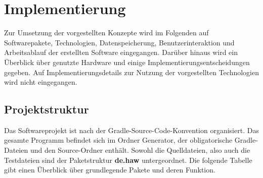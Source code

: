 
\chapter{Implementierung}

Zur Umsetzung der vorgestellten Konzepte wird im Folgenden auf Softwarepakete, Technologien, Datenspeicherung,
Benutzerinteraktion und Arbeitsablauf der erstellten Software eingegangen.
Darüber hinaus wird ein Überblick über genutzte Hardware und einige Implementierungsentscheidungen gegeben.
Auf Implementierungsdetails zur Nutzung der vorgestellten Technologien wird nicht eingegangen.

\section{Projektstruktur}
Das Softwareprojekt ist nach der Gradle-Source-Code-Konvention organisiert.
Das gesamte Programm befindet sich im Ordner Generator, der obligatorische Gradle-Dateien und den
Source-Ordner enthält.
Sowohl die Quelldateien, also auch die Testdateien sind der Paketstruktur \textbf{de.haw} untergeordnet.
Die folgende Tabelle gibt einen Überblick über grundlegende Pakete und deren Funktion.

